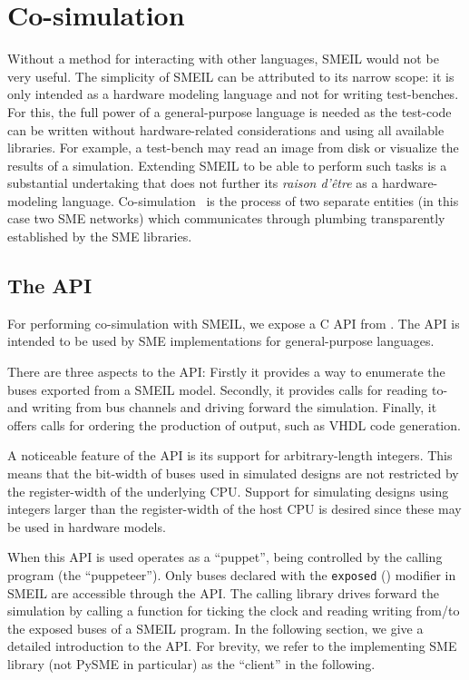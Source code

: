 \chapter{Co-simulation}
\label{sec:cosim}

Without a method for interacting with other languages, SMEIL would not be very
useful. The simplicity of SMEIL can be attributed to its narrow scope: it is
only intended as a hardware modeling language and not for writing
test-benches. For this, the full power of a general-purpose language is needed
as the test-code can be written without hardware-related considerations and
using all available libraries. For example, a test-bench may read an image from
disk or visualize the results of a simulation. Extending SMEIL to be able to
perform such tasks is a substantial undertaking that does not further its
{\itshape raison d'être} as a hardware-modeling
language. Co-simulation~\cite{schloegl2015towards} is the process of two
separate entities (in this case two SME networks) which communicates through
plumbing transparently established by the SME libraries.

\section{The API}
For performing co-simulation with SMEIL, we expose a C API from \libsme{}. The
API is intended to be used by SME implementations for general-purpose languages.

There are three aspects to the API: Firstly it provides a way to enumerate the
buses exported from a SMEIL model. Secondly, it provides calls for reading to-
and writing from bus channels and driving forward the simulation. Finally, it
offers calls for ordering the production of output, such as VHDL code
generation.

A noticeable feature of the API is its support for arbitrary-length
integers. This means that the bit-width of buses used in simulated designs are
not restricted by the register-width of the underlying CPU. Support for
simulating designs using integers larger than the register-width of the host CPU
is desired since these may be used in hardware models.


When this API is used \libsme{} operates as a ``puppet'', being controlled by
the calling program (the ``puppeteer''). Only buses declared with the
\texttt{exposed} () modifier in SMEIL are accessible through
the \libsme{} API. The calling library drives forward the simulation by calling
a function for ticking the clock and reading writing from/to the exposed buses
of a SMEIL program. In the following section, we give a detailed introduction to
the API.  For brevity, we refer to the implementing SME library (not PySME in
particular) as the ``client'' in the following.

